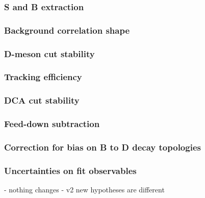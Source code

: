 \subsubsection{S and B extraction}

\subsubsection{Background correlation shape}

\subsubsection{D-meson cut stability}

\subsubsection{Tracking efficiency}

\subsubsection{DCA cut stability}

\subsubsection{Feed-down subtraction}

\subsubsection{Correction for bias on B to D decay topologies}

\subsubsection{Uncertainties on fit observables}
- nothing changes
- v2 new hypotheses are different